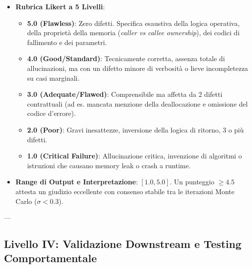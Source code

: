 \begin{itemize}[leftmargin=*, label=\textbullet]
    Siano $S_A^{(k)} \in [1, 5]$ e $S_B^{(k)} \in [1, 5]$ i punteggi assegnati alla $k$-esima iterazione. Si calcolano la media e la deviazione standard empirica per ciascuna prospettiva:
    \begin{align}
        \mu_A &= \frac{1}{K}\sum_{k=1}^K S_A^{(k)}, \quad \sigma_A = \sqrt{\frac{1}{K-1}\sum_{k=1}^K (S_A^{(k)} - \mu_A)^2} \label{eq:judge_a} \\
        \mu_B &= \frac{1}{K}\sum_{k=1}^K S_B^{(k)}, \quad \sigma_B = \sqrt{\frac{1}{K-1}\sum_{k=1}^K (S_B^{(k)} - \mu_B)^2} \label{eq:judge_b}
    \end{align}
    Il punteggio combinato finale è formulato come:
    \begin{equation}
        S_{Judge} = \frac{\mu_A + \mu_B}{2}
        \label{eq:judge_combined}
    \end{equation}
    \item \textbf{Rubrica Likert a 5 Livelli}:
    \begin{itemize}
        \item \textbf{5.0 (Flawless)}: Zero difetti. Specifica esaustiva della logica operativa, della proprietà della memoria (\emph{caller vs callee ownership}), dei codici di fallimento e dei parametri.
        \item \textbf{4.0 (Good/Standard)}: Tecnicamente corretta, assenza totale di allucinazioni, ma con un difetto minore di verbosità o lieve incompletezza su casi marginali.
        \item \textbf{3.0 (Adequate/Flawed)}: Comprensibile ma affetta da 2 difetti contrattuali (ad es. mancata menzione della deallocazione e omissione del codice d'errore).
        \item \textbf{2.0 (Poor)}: Gravi inesattezze, inversione della logica di ritorno, 3 o più difetti.
        \item \textbf{1.0 (Critical Failure)}: Allucinazione critica, invenzione di algoritmi o istruzioni che causano memory leak o crash a runtime.
    \end{itemize}
    \item \textbf{Range di Output e Interpretazione}: $[1.0, 5.0]$. Un punteggio $\ge 4.5$ attesta un giudizio eccellente con consenso stabile tra le iterazioni Monte Carlo ($\sigma < 0.3$).
\end{itemize}

---

\subsection{Livello IV: Validazione Downstream e Testing Comportamentale}

